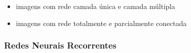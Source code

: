 \documentclass{automatextcc}
\begin{document}
\begin{itemize}
    \item imagens com rede camada única e camada múltipla
    \item imagens com rede totalmente e parcialmente conectada
\end{itemize}

\subsubsection{Redes Neurais Recorrentes}


\end{document}
